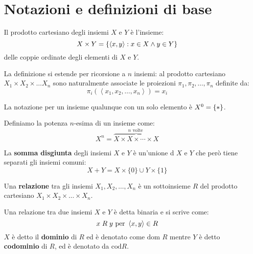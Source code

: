 \documentclass[\main/main.tex]{subfiles}
\begin{document}
\chapter{Notazioni e definizioni di base}
\begin{multicols}{2}
    \begin{definition}
        Il prodotto cartesiano degli insiemi \(X\) e \(Y\) è l'insieme:
        \[
            X \times Y = \left\{\left\langle x, y\right\rangle: x \in X \land y \in Y\right\}
        \]
        delle coppie ordinate degli elementi di \(X\) e \(Y\).
        
        La definizione si estende per ricorsione a \(n\) insiemi: al prodotto cartesiano \(X_1 \times X_2 \times \ldots X_n\) sono naturalmente associate le proiezioni \(\pi_1, \pi_2, \ldots, \pi_n\) definite da:
        \[
            \pi_{i}\left(\left\langle x_{1}, x_{2}, \ldots, x_{n}\right\rangle\right)=x_{i}
        \]
    \end{definition}
    \begin{definition}
        La notazione per un insieme qualunque con un solo elemento è \(
            X^0 = \left\{*\right\}
        \).
    \end{definition}
    \begin{definition}
        Definiamo la potenza \(n\)-esima di un insieme come:
        \[
            X^{n}=\overbrace{X \times X \times \cdots \times X}^{n \text { volte }}
        \]
    \end{definition}
    \begin{definition}
        La \textbf{somma disgiunta} degli insiemi \(X\) e \(Y\) è un'unione d \(X\) e \(Y\) che però tiene separati gli insiemi comuni:
        \[
            X+Y=X \times\{0\} \cup Y \times\{1\}
        \]
    \end{definition}
    \begin{definition}
        Una \textbf{relazione} tra gli insiemi \(X_1, X_2, \ldots, X_n\) è un sottoinsieme \(R\) del prodotto cartesiano \(X_1 \times X_2 \times \ldots \times X_n\). 
    \end{definition}
    \begin{definition}
        Una relazione tra due insiemi \(X\) e \(Y\) è detta binaria e si scrive come:
        \[
            x\;R\;y \text{ per } \left\langle x, y\right\rangle \in R
        \]
        \(X\) è detto il \textbf{dominio} di \(R\) ed è denotato come \(\text{dom }R\) mentre \(Y\) è detto \textbf{codominio} di \(R\), ed è denotato da \(\text{cod} R\). 

\end{definition}
\end{multicols}
\end{document}
